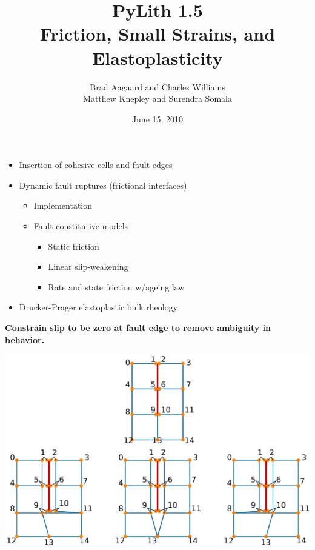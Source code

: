 \documentclass[pdftex,cig,slideColor]{pp4slides}
\title{PyLith 1.5\\
  Friction, Small Strains, and Elastoplasticity}
\author{Brad Aagaard and Charles Williams\\[10pt]
  Matthew Knepley and Surendra Somala}
\date{June 15, 2010}
\begin{document}
\maketitle


  \begin{itemize}
  \item Insertion of cohesive cells and fault edges
  \item Dynamic fault ruptures (frictional interfaces)
    \begin{itemize}
    \item Implementation
    \item Fault constitutive models
      \begin{itemize}
      \item Static friction
      \item Linear slip-weakening
      \item Rate and state friction w/ageing law
      \end{itemize}
    \end{itemize}
  \item Drucker-Prager elastoplastic bulk rheology
  \end{itemize}






  \vfill
  {\bf Constrain slip to be zero at fault edge to remove ambiguity in
  behavior.}
 \vfill
  \begin{center}
    \includegraphics{figs/fault_edge}
  \end{center}
  \vfill
\end{document}
